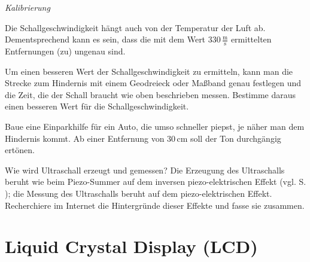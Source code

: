 \begin{aufgabe} \emph{Kalibrierung}
	
	Die Schallgeschwindigkeit hängt auch von der Temperatur der Luft ab. Dementsprechend kann es sein, dass die mit dem Wert $330\,\frac{\text{m}}{\text{s}}$ ermittelten Entfernungen (zu) ungenau sind.
	
	Um einen besseren Wert der Schallgeschwindigkeit zu ermitteln, kann man die Strecke zum Hindernis mit einem Geodreieck oder Maßband genau festlegen und die Zeit, die der Schall braucht wie oben beschrieben messen. Bestimme daraus einen besseren Wert für die Schallgeschwindigkeit.
\end{aufgabe}

\begin{projekt} \label{proj:einparkhilfe}
	Baue eine Einparkhilfe für ein Auto, die umso schneller piepst, je näher man dem Hindernis kommt. Ab einer Entfernung von 30\,cm soll der Ton durchgängig ertönen.
\end{projekt}

\begin{recherche}{Wie wird Ultraschall erzeugt und gemessen?}
	Die Erzeugung des Ultraschalls beruht wie beim Piezo-Summer auf dem inversen piezo-elektrischen Effekt (vgl. S. \pageref{piezo-effekt}); die Messung des Ultraschalls beruht auf dem piezo-elektrischen Effekt. Recherchiere im Internet die Hintergründe dieser Effekte und fasse sie zusammen.
\end{recherche}
\vfill

\newpage
{}
\onehalfspacing
\section{Liquid Crystal Display (LCD)}
\label{sec:lcd}
\setcounter{aufgabennummer}{0}
\setcounter{projektnummer}{0}

